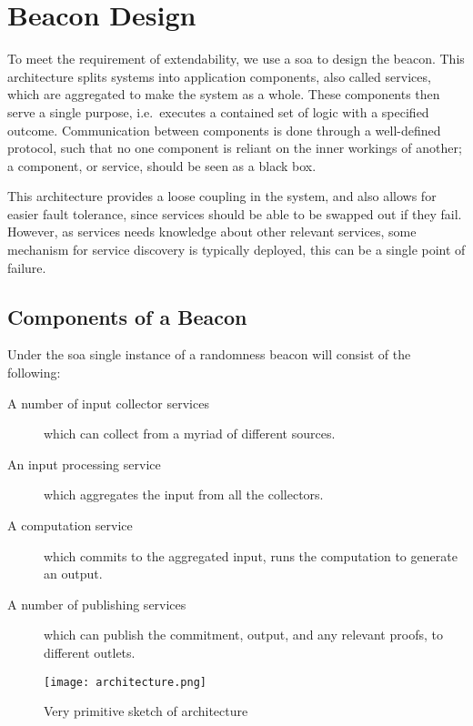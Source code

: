 \section{Beacon Design}

To meet the requirement of extendability, we use a \gls{soa} to design the beacon.
This architecture splits systems into application components, also called services, which are aggregated to make the system as a whole.
These components then serve a single purpose, i.e.\ executes a contained set of logic with a specified outcome.
Communication between components is done through a well-defined protocol, such that no one component is reliant on the inner workings of another;
a component, or service, should be seen as a black box.

This architecture provides a loose coupling in the system, and also allows for easier fault tolerance, since services should be able to be swapped out if they fail.
However, as services needs knowledge about other relevant services, some mechanism for service discovery is typically deployed, this can be a single point of failure.

\subsection{Components of a Beacon}
\label{sub:components_of_a_beacon}
Under the \gls{soa} single instance of a randomness beacon will consist of the following:
\begin{description}
    \item[A number of input collector services] which can collect from a myriad of different sources.
    \item[An input processing service] which aggregates the input from all the collectors.
    \item[A computation service] which commits to the aggregated input, runs the computation to generate an output.
    \item[A number of publishing services] which can publish the commitment, output, and any relevant proofs, to different outlets.
\end{description}

\begin{figure*}[htpb]
    \centering
    \texttt{[image: architecture.png]}
    \caption{Very primitive sketch of architecture}
\end{figure*}

